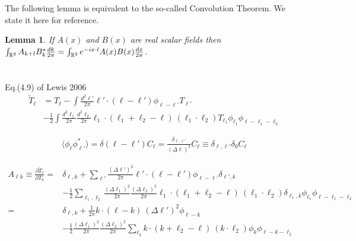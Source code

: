 \documentclass[noinfoline]{imsart}
\newtheorem{lemma}{Lemma}
\begin{document}
The following lemma is equivalent to the so-called Convolution Theorem. We state it here for reference.
\begin{lemma}
\label{conv}
If $A(x)$ and $B(x)$ are real scalar fields then  $\int_{\Bbb R^2} A_{k+l}  B^*_k \frac{dk}{2\pi}= \int_{\Bbb R^2} e^{-ix\cdot l} A(x)B(x)\frac{dx}{2\pi}$.
\end{lemma}


\section{}

Eq.(4.9) of Lewis 2006
\begin{align}
\tilde T_\ell
&= T_\ell -\int \frac{d^2\ell'}{2\pi} \ell'\cdot(\ell-\ell')\phi_{\ell-\ell'} T_{\ell'}\\
& -\frac{1}{2}\int \frac{d^2\ell_1}{2\pi}\frac{d^2\ell_2}{2\pi} \ell_1\cdot(\ell_1+\ell_2-\ell)\ (\ell_1\cdot\ell_2)
T_{\ell_1} \phi_{\ell_1}\phi_{\ell-\ell_1-\ell_2} \nonumber
\end{align}

\begin{align}
\langle \phi_\ell \phi_{\ell'}^* \rangle = \delta(\ell-\ell') C_\ell
= \frac{\delta_{\ell,\ell'}}{(\Delta \ell)^2} C_\ell \equiv \delta_{\ell,\ell'}\delta_0 C_\ell
\end{align}

\begin{align}
A_{\ell k}\equiv\frac{\partial \tilde T_\ell}{\partial T_k}
=& \delta_{\ell,k} + \sum_{\ell'}\frac{(\Delta\ell')^2}{2\pi} \ell'\cdot(\ell-\ell')\phi_{\ell-\ell'} \delta_{\ell',k}\\
& -\frac{1}{2}\sum_{\ell_1,\ell_2} \frac{(\Delta\ell_1)^2}{2\pi}\frac{(\Delta \ell_2)^2}{2\pi} \ell_1\cdot(\ell_1+\ell_2-\ell)\ (\ell_1\cdot\ell_2)
\delta_{\ell_1,k} \phi_{\ell_1}\phi_{\ell-\ell_1-\ell_2} \nonumber\\
=& \delta_{\ell,k} + \frac{1}{2\pi} k\cdot(\ell-k)\ (\Delta\ell')^2\phi_{\ell-k} \nonumber\\
& -\frac{1}{2}\frac{(\Delta\ell_1)^2}{2\pi}\frac{(\Delta \ell_2)^2}{2\pi} \sum_{\ell_2}  k\cdot(k+\ell_2-\ell)\ (k\cdot\ell_2)
\phi_{k}\phi_{\ell-k-\ell_2}
\end{align}
\end{document}
